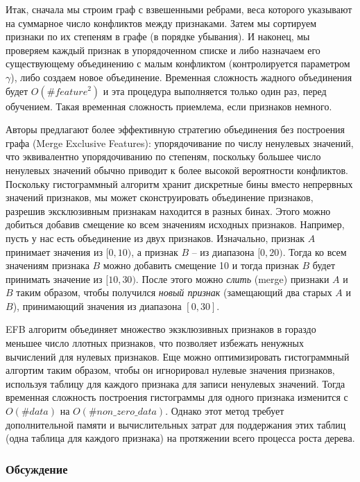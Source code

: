 \documentclass[%
	11pt,
	a4paper,
	utf8,
		]{article}
\begin{document}
Итак, сначала мы строим граф с взвешенными ребрами, веса которого указывают на суммарное число конфликтов между признаками. Затем мы сортируем признаки по их степеням в графе (в порядке убывания). И наконец, мы проверяем каждый признак в упорядоченном списке и либо назначаем его существующему объединению с малым конфликтом (контролируется параметром $ \gamma $), либо создаем новое объединение. Временная сложность жадного объединения будет $ O(\#feature^2) $ и эта процедура выполняется только один раз, перед обучением. Такая временная сложность приемлема, если признаков немного.

Авторы предлагают более эффективную стратегию объединения без построения графа (Merge Exclusive Features): упорядочивание по числу ненулевых значений, что эквивалентно упорядочиванию по степеням, поскольку большее число ненулевых значений обычно приводит к более высокой вероятности конфликтов. Поскольку гистограммный алгоритм хранит дискретные бины вместо непрервных значений признаков, мы может сконструировать объединение признаков, разрешив эксклюзивным признакам находится в разных бинах. Этого можно добиться добавив смещение ко всем значениям исходных признаков. Например, пусть у нас есть объединение из двух признаков. Изначально, признак $ A $ принимает значения из $ [0, 10) $, а признак $ B $ -- из диапазона $ [0, 20) $. Тогда ко всем значениям признака $ B $ можно добавить смещение 10 и тогда признак $ B $ будет принимать значение из $ [10, 30) $. После этого можно \emph{слить} (merge) признаки $ A $ и $ B $ таким образом, чтобы получился \emph{новый признак} (замещающий два старых $ A $ и $ B $), принимающий значения из диапазона $ [0, 30] $.

EFB алгоритм объединяет множество экзклюзивных признаков в гораздо меньшее число ллотных признаков, что позволяет избежать ненужных вычислений для нулевых признаков. Еще можно оптимизировать гистограммный алгортим таким образом, чтобы он игнорировал нулевые значения признаков, используя таблицу для каждого признака для записи ненулевых значений. Тогда временная сложность построения гистограммы для одного признака изменится с $ O(\#data) $ на $ O(\#non\_zero\_data) $. Однако этот метод требует дополнительной памяти и вычислительных затрат для поддержания этих таблиц (одна таблица для каждого признака) на протяжении всего процесса роста дерева. 

\subsubsection{Обсуждение}
\end{document}

